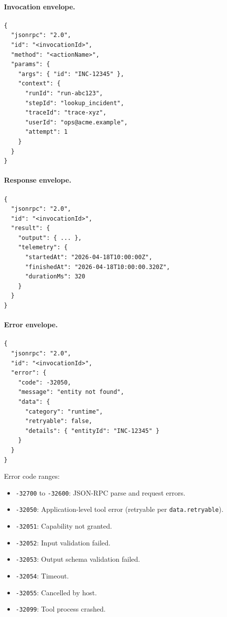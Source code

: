 \paragraph{Invocation envelope.}
\begin{verbatim}
{
  "jsonrpc": "2.0",
  "id": "<invocationId>",
  "method": "<actionName>",
  "params": {
    "args": { "id": "INC-12345" },
    "context": {
      "runId": "run-abc123",
      "stepId": "lookup_incident",
      "traceId": "trace-xyz",
      "userId": "ops@acme.example",
      "attempt": 1
    }
  }
}
\end{verbatim}

\paragraph{Response envelope.}
\begin{verbatim}
{
  "jsonrpc": "2.0",
  "id": "<invocationId>",
  "result": {
    "output": { ... },
    "telemetry": {
      "startedAt": "2026-04-18T10:00:00Z",
      "finishedAt": "2026-04-18T10:00:00.320Z",
      "durationMs": 320
    }
  }
}
\end{verbatim}

\paragraph{Error envelope.}
\begin{verbatim}
{
  "jsonrpc": "2.0",
  "id": "<invocationId>",
  "error": {
    "code": -32050,
    "message": "entity not found",
    "data": {
      "category": "runtime",
      "retryable": false,
      "details": { "entityId": "INC-12345" }
    }
  }
}
\end{verbatim}

Error code ranges:

\begin{itemize}
  \item \texttt{-32700} to \texttt{-32600}: JSON-RPC parse and request errors.
  \item \texttt{-32050}: Application-level tool error (retryable per
        \texttt{data.retryable}).
  \item \texttt{-32051}: Capability not granted.
  \item \texttt{-32052}: Input validation failed.
  \item \texttt{-32053}: Output schema validation failed.
  \item \texttt{-32054}: Timeout.
  \item \texttt{-32055}: Cancelled by host.
  \item \texttt{-32099}: Tool process crashed.
\end{itemize}

